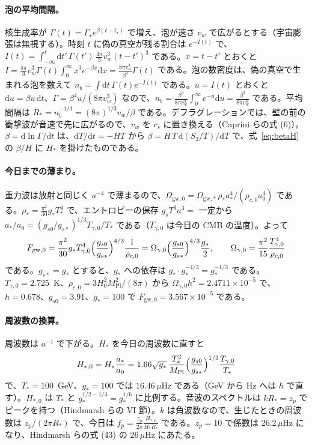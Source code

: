 \documentclass[a4paper,10pt]{ltjsarticle}
\newcommand{\dd}{\mathrm{d}}
\begin{document}
\paragraph{泡の平均間隔。}核生成率が $\Gamma(t)=\Gamma_\star e^{\beta(t-t_\star)}$ で増え、泡が速さ $v_w$ で広がるとする（宇宙膨張は無視する）。時刻 $t$ に偽の真空が残る割合は $e^{-I(t)}$ で、$I(t)=\int_{-\infty}^t\dd t'\,\Gamma(t')\,\frac{4\pi}3v_w^3(t-t')^3$ である。$x=t-t'$ とおくと $I=\frac{4\pi}3v_w^3\Gamma(t)\int_0^\infty x^3e^{-\beta x}\dd x=\frac{8\pi v_w^3}{\beta^4}\Gamma(t)$ である。泡の数密度は、偽の真空で生まれる泡を数えて $n_b=\int\dd t\,\Gamma(t)e^{-I(t)}$ である。$u=I(t)$ とおくと $\dd u=\beta u\,\dd t$、$\Gamma=\beta^4u/(8\pi v_w^3)$ なので、$n_b=\frac{\beta^3}{8\pi v_w^3}\int_0^\infty e^{-u}\dd u=\frac{\beta^3}{8\pi v_w^3}$ である。平均間隔は $R_*=n_b^{-1/3}=(8\pi)^{1/3}v_w/\beta$ である。デフラグレーションでは、壁の前の衝撃波が音速で先に広がるので、$v_w$ を $c_s$ に置き換える（Caprini らの式 (6)）。$\beta=\dd\ln\Gamma/\dd t$ は、$\dd T/\dd t=-HT$ から $\beta=H\,T\,\dd(S_3/T)/\dd T$ で、式~\eqref{eq:betaH} の $\beta/H$ に $H_*$ を掛けたものである。

\paragraph{今日までの薄まり。}重力波は放射と同じく $a^{-4}$ で薄まるので、$\Omega_{\mathrm{gw},0}=\Omega_{\mathrm{gw},*}\,\rho_*a_*^4/(\rho_{c,0}a_0^4)$ である。$\rho_*=\frac{\pi^2}{30}g_*T_*^4$ で、エントロピーの保存 $g_sT^3a^3=$ 一定から $a_*/a_0=(g_{s0}/g_{s*})^{1/3}T_{\gamma,0}/T_*$ である（$T_{\gamma,0}$ は今日の CMB の温度）。よって
\begin{equation*}
F_{\mathrm{gw},0}=\frac{\pi^2}{30}g_*T_{\gamma,0}^4\Bigl(\frac{g_{s0}}{g_{s*}}\Bigr)^{4/3}\frac1{\rho_{c,0}}=\Omega_{\gamma,0}\Bigl(\frac{g_{s0}}{g_{s*}}\Bigr)^{4/3}\frac{g_*}{2},\qquad
\Omega_{\gamma,0}=\frac{\pi^2}{15}\frac{T_{\gamma,0}^4}{\rho_{c,0}}
\end{equation*}
である。$g_{s*}=g_*$ とすると、$g_*$ への依存は $g_*\cdot g_*^{-4/3}=g_*^{-1/3}$ である。$T_{\gamma,0}=2.725$~K、$\rho_{c,0}=3H_0^2M_{\mathrm{Pl}}^2/(8\pi)$ から $\Omega_{\gamma,0}h^2=2.4711\times10^{-5}$ で、$h=0.678$、$g_{s0}=3.91$、$g_*=100$ で $F_{\mathrm{gw},0}=3.567\times10^{-5}$ である。

\paragraph{周波数の換算。}周波数は $a^{-1}$ で下がる。$H_*$ を今日の周波数に直すと
\begin{equation*}
H_{*,0}=H_*\frac{a_*}{a_0}=1.66\sqrt{g_*}\,\frac{T_*^2}{M_{\mathrm{Pl}}}\Bigl(\frac{g_{s0}}{g_{s*}}\Bigr)^{1/3}\frac{T_{\gamma,0}}{T_*}
\end{equation*}
で、$T_*=100$~GeV、$g_*=100$ では $16.46\,\mu$Hz である（GeV から Hz へは $\hbar$ で直す）。$H_{*,0}$ は $T_*$ と $g_*^{1/2-1/3}=g_*^{1/6}$ に比例する。音波のスペクトルは $kR_*=z_p$ でピークを持つ（Hindmarsh らの VI 節）。$k$ は角波数なので、生じたときの周波数は $z_p/(2\pi R_*)$ で、今日は $f_p=\frac{z_p}{2\pi}\frac{H_{*,0}}{H_*R_*}$ である。$z_p=10$ で係数は $26.2\,\mu$Hz になり、Hindmarsh らの式 (43) の $26\,\mu$Hz にあたる。
\end{document}
